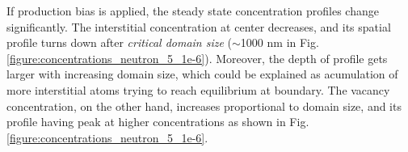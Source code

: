 \documentclass[a4paper]{article}
\begin{document}
      \newpage
       If production bias is applied, the steady state concentration profiles change significantly. The interstitial concentration at center decreases, and its spatial profile turns down after \textit{critical domain size} (${\sim}$1000 nm in Fig. \ref{figure:concentrations_neutron_5_1e-6}). Moreover, the depth of profile gets larger with increasing domain size, which could be explained as acumulation of more interstitial atoms trying to reach equilibrium at boundary. The vacancy concentration, on the other hand, increases proportional to domain size, and its profile having peak at higher concentrations as shown in Fig. \ref{figure:concentrations_neutron_5_1e-6}.\\
      \begin{figure}[h!]  %
        \centering
        \qquad

\end{figure}
\end{document}
